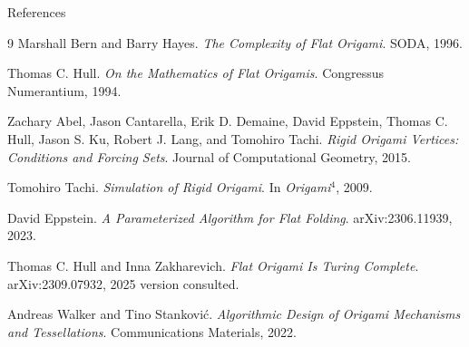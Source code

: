 \documentclass[aspectratio=169,10pt]{beamer}
\begin{document}
\begin{frame}[allowframebreaks]{References}
\footnotesize
\begin{thebibliography}{9}
Marshall Bern and Barry Hayes.
\newblock \emph{The Complexity of Flat Origami}.
\newblock SODA, 1996.

Thomas C. Hull.
\newblock \emph{On the Mathematics of Flat Origamis}.
\newblock Congressus Numerantium, 1994.

Zachary Abel, Jason Cantarella, Erik D. Demaine, David Eppstein, Thomas C. Hull, Jason S. Ku, Robert J. Lang, and Tomohiro Tachi.
\newblock \emph{Rigid Origami Vertices: Conditions and Forcing Sets}.
\newblock Journal of Computational Geometry, 2015.

Tomohiro Tachi.
\newblock \emph{Simulation of Rigid Origami}.
\newblock In \emph{Origami$^4$}, 2009.

David Eppstein.
\newblock \emph{A Parameterized Algorithm for Flat Folding}.
\newblock arXiv:2306.11939, 2023.

Thomas C. Hull and Inna Zakharevich.
\newblock \emph{Flat Origami Is Turing Complete}.
\newblock arXiv:2309.07932, 2025 version consulted.

Andreas Walker and Tino Stankovi\'c.
\newblock \emph{Algorithmic Design of Origami Mechanisms and Tessellations}.
\newblock Communications Materials, 2022.
\end{thebibliography}
\end{frame}
\end{document}
